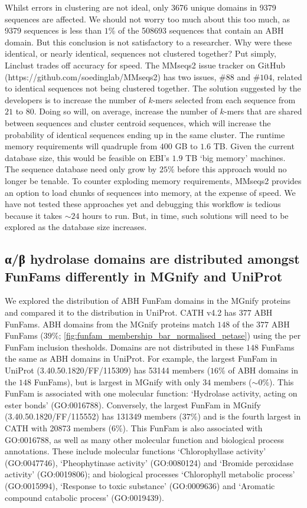 Whilst errors in clustering are not ideal, only \num{3676} unique domains in \num{9379} sequences are affected. We should not worry too much about this too much, as \num{9379} sequences is less than $1\%$ of the \num{508693} sequences that contain an ABH domain. But this conclusion is not satisfactory to a researcher. Why were these identical, or nearly identical, sequences not clustered together? Put simply, Linclust trades off accuracy for speed. The MMseqs2 issue tracker on GitHub (https://github.com/soedinglab/MMseqs2) has two issues, \#$88$ and \#$104$, related to identical sequences not being clustered together. The solution suggested by the developers is to increase the number of $k$-mers selected from each sequence from $21$ to $80$. Doing so will, on average, increase the number of $k$-mers that are shared between sequences and cluster centroid sequences, which will increase the probability of identical sequences ending up in the same cluster. The runtime memory requirements will quadruple from $400$ GB to $1.6$ TB. Given the current database size, this would be feasible on EBI's $1.9$ TB `big memory' machines. The sequence database need only grow by $25\%$ before this approach would no longer be tenable. To counter exploding memory requirements, MMseqs2 provides an option to load chunks of sequences into memory, at the expense of speed. We have not tested these approaches yet and debugging this workflow is tedious because it takes $\sim 24$ hours to run. But, in time, such solutions will need to be explored as the database size increases.

\subsection{α/β hydrolase domains are distributed amongst FunFams differently in MGnify and UniProt}

We explored the distribution of ABH FunFam domains in the MGnify proteins and compared it to the distribution in UniProt. CATH v4.2 has $377$ ABH FunFams. ABH domains from the MGnify proteins match $148$ of the $377$ ABH FunFams ($39\%$; \ref{fig:funfam_membership_bar_normalised_petase}) using the per FunFam inclusion thesholds.
Domains are not distributed in these $148$ FunFams the same as ABH domains in UniProt. For example, the largest FunFam in UniProt (3.40.50.1820/FF/115309) has \num{53144} members ($16\%$ of ABH domains in the $148$ FunFams), but is  largest in MGnify with only $34$ members ($\sim 0\%$). This FunFam is associated with one molecular function: `Hydrolase activity, acting on ester bonds' (GO:0016788).
Conversely, the largest FunFam in MGnify (3.40.50.1820/FF/115552) has \num{131349} members ($37\%$) and is the fourth largest in CATH with \num{20873} members ($6\%$).
This FunFam is also associated with GO:0016788, as well as many other molecular function and biological process annotations. These include molecular functions `Chlorophyllase activity' (GO:0047746), `Pheophytinase activity' (GO:0080124) and `Bromide peroxidase activity' (GO:0019806); and biological processes `Chlorophyll metabolic process' (GO:0015994), `Response to toxic substance' (GO:0009636) and `Aromatic compound catabolic process' (GO:0019439).

